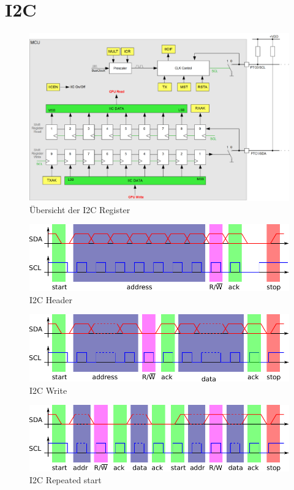 \newpage
\section{I2C}

\begin{figure}[h!]
	\centering
	\includegraphics[width=1\textwidth]{../fig/i2c.pdf}
	\caption{Übersicht der I2C Register}
\end{figure}

\newpage
\begin{figure}[h!]
	\centering
	\includegraphics[width=1\textwidth]{../fig/i2c_header.pdf}
	\caption{I2C Header}
\end{figure}

\begin{figure}[h!]
	\centering
	\includegraphics[width=1\textwidth]{../fig/i2c_write.pdf}
	\caption{I2C Write}
\end{figure}

\begin{figure}[h!]
	\centering
	\includegraphics[width=1\textwidth]{../fig/i2c_repeat.pdf}
	\caption{I2C Repeated start}
\end{figure}

